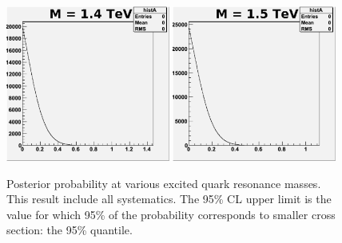 \begin{figure}[!ht]
\begin{center}
     \includegraphics[width=0.48\textwidth]{Figures/MCpost1400_6_pe0.pdf}
     \includegraphics[width=0.48\textwidth]{Figures/MCpost1500_6_pe0.pdf}
 \caption{Posterior probability at
 various excited quark resonance masses.  This result include all systematics.
 The 95\% CL upper limit is the value for which 95\% of
 the probability corresponds to smaller cross section: the 95\% quantile.}
    \label{likeli}
  \end{center}
\end{figure}

\clearpage

